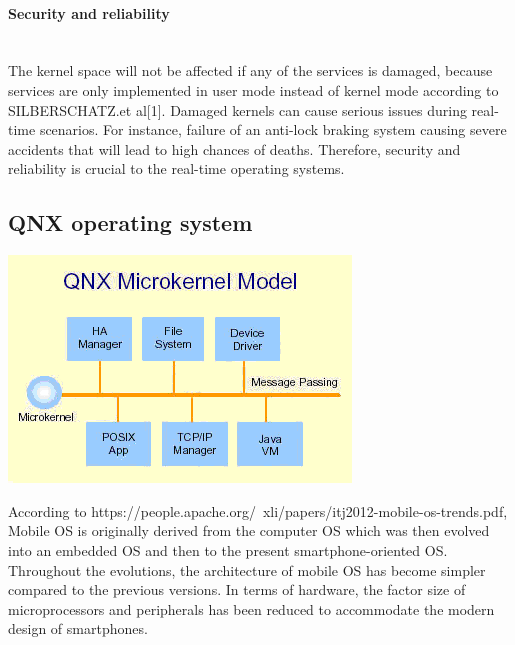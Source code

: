 \documentclass[conference]{IEEEtran}
\begin{document}
\paragraph{Security and reliability}\mbox{} \\
The kernel space will not be affected if any of the services is damaged, because services are only implemented in user mode instead of kernel mode according to SILBERSCHATZ.et al[1]. Damaged kernels can cause serious issues during real-time scenarios. For instance, failure of an anti-lock braking system causing severe accidents that will lead to high chances of deaths. Therefore, security and reliability is crucial to the real-time operating systems.

\subsection{QNX operating system}
\begin{center}
\includegraphics[scale=0.5]{./images/QNX_microkernel_mode.png}
\end{center}
According to https://people.apache.org/~xli/papers/itj2012-mobile-os-trends.pdf, Mobile OS is originally derived from the computer OS which was then evolved into an embedded OS and then to the present smartphone-oriented OS. Throughout the evolutions, the architecture of mobile OS has become simpler compared to the previous versions. In terms of hardware, the factor size of microprocessors and peripherals has been reduced to accommodate the modern design of smartphones. 

\end{document}
